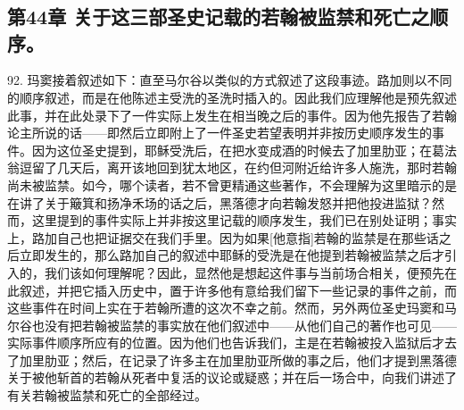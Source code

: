 
\section{}


\subsection{第44章 关于这三部圣史记载的若翰被监禁和死亡之顺序。}

92. 玛窦接着叙述如下：直至马尔谷以类似的方式叙述了这段事迹。路加则以不同的顺序叙述，而是在他陈述主受洗的圣洗时插入的。因此我们应理解他是预先叙述此事，并在此处录下了一件实际上发生在相当晚之后的事件。因为他先报告了若翰论主所说的话——即然后立即附上了一件圣史若望表明并非按历史顺序发生的事件。因为这位圣史提到，耶稣受洗后，在把水变成酒的时候去了加里肋亚；在葛法翁逗留了几天后，离开该地回到犹太地区，在约但河附近给许多人施洗，那时若翰尚未被监禁。如今，哪个读者，若不曾更精通这些著作，不会理解为这里暗示的是在讲了关于簸箕和扬净禾场的话之后，黑落德才向若翰发怒并把他投进监狱？然而，这里提到的事件实际上并非按这里记载的顺序发生，我们已在别处证明；事实上，路加自己也把证据交在我们手里。因为如果[他意指]若翰的监禁是在那些话之后立即发生的，那么路加自己的叙述中耶稣的受洗是在他提到若翰被监禁之后才引入的，我们该如何理解呢？因此，显然他是想起这件事与当前场合相关，便预先在此叙述，并把它插入历史中，置于许多他有意给我们留下一些记录的事件之前，而这些事件在时间上实在于若翰所遭的这次不幸之前。然而，另外两位圣史玛窦和马尔谷也没有把若翰被监禁的事实放在他们叙述中——从他们自己的著作也可见——实际事件顺序所应有的位置。因为他们也告诉我们，主是在若翰被投入监狱后才去了加里肋亚；然后，在记录了许多主在加里肋亚所做的事之后，他们才提到黑落德关于被他斩首的若翰从死者中复活的议论或疑惑；并在后一场合中，向我们讲述了有关若翰被监禁和死亡的全部经过。\par


